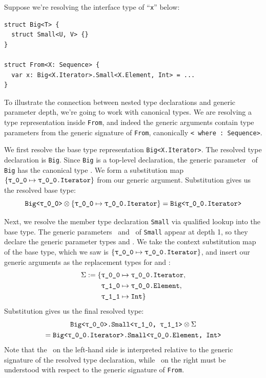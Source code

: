 \documentclass[../generics]{subfiles}
\begin{document}
\begin{example}
Suppose we're resolving the interface type of ``\texttt{x}'' below:
\begin{Verbatim}
struct Big<T> {
  struct Small<U, V> {}
}

struct From<X: Sequence> {
  var x: Big<X.Iterator>.Small<X.Element, Int> = ...
}
\end{Verbatim}
To illustrate the connection between nested type declarations and generic parameter depth, we're going to work with canonical types. We are resolving a type representation inside \texttt{From}, and indeed the generic arguments contain type parameters from the generic signature of \texttt{From}, canonically \texttt{<\rT\ where \rT:~Sequence>}.

We first resolve the base type representation \texttt{Big<X.Iterator>}. The resolved type declaration is \texttt{Big}. Since \texttt{Big} is a top-level declaration, the generic parameter \tT\ of \texttt{Big} has the canonical type \rT. We form a substitution map $\SubstMap{\SubstType{\rT}{\rT.Iterator}}$ from our generic argument. Substitution gives us the resolved base type:
\[\texttt{Big<\rT>}\otimes\SubstMap{\SubstType{\rT}{\rT.Iterator}}=\texttt{Big<\rT.Iterator>}\]

Next, we resolve the member type declaration \texttt{Small} via qualified lookup into the base type. The generic parameters \tU\ and \tV\ of \texttt{Small} appear at depth 1, so they declare the generic parameter types  and . We take the context substitution map of the base type, which we saw is $\SubstMap{\SubstType{\rT}{\rT.Iterator}}$, and insert our generic arguments as the replacement types for  and :
\begin{align*}
\Sigma := \SubstMap{&\SubstType{\rT}{\rT.Iterator},\\
&\SubstType{\ttgp{1}{0}}{\rT.Element},\\
&\SubstType{\ttgp{1}{1}}{Int}}
\end{align*}
Substitution gives us the final resolved type:
\begin{multline*}
\texttt{Big<\rT>.Small<\ttgp{1}{0}, \ttgp{1}{1}>}\otimes\Sigma\\
= \texttt{Big<\rT.Iterator>.Small<\rT.Element, Int>}
\end{multline*}
Note that the \rT\ on the left-hand side is interpreted relative to the generic signature of the resolved type declaration, while \rT\ on the right must be understood with respect to the generic signature of \texttt{From}.
\end{example}
\end{document}
